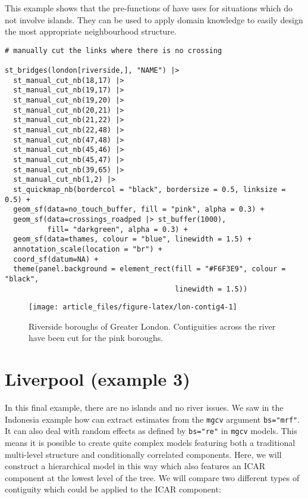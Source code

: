 This example shows that the pre-functions of  have uses for situations which do not involve islands. They can be used to apply domain knowledge to easily design the most appropriate neighbourhood structure.

\begin{verbatim}
# manually cut the links where there is no crossing

st_bridges(london[riverside,], "NAME") |> 
  st_manual_cut_nb(18,17) |> 
  st_manual_cut_nb(19,17) |> 
  st_manual_cut_nb(19,20) |> 
  st_manual_cut_nb(20,21) |> 
  st_manual_cut_nb(21,22) |> 
  st_manual_cut_nb(22,48) |> 
  st_manual_cut_nb(47,48) |> 
  st_manual_cut_nb(45,46) |> 
  st_manual_cut_nb(45,47) |>  
  st_manual_cut_nb(39,65) |> 
  st_manual_cut_nb(1,2) |> 
  st_quickmap_nb(bordercol = "black", bordersize = 0.5, linksize = 0.5) +
  geom_sf(data=no_touch_buffer, fill = "pink", alpha = 0.3) + 
  geom_sf(data=crossings_roadped |> st_buffer(1000), 
          fill= "darkgreen", alpha = 0.3) +
  geom_sf(data=thames, colour = "blue", linewidth = 1.5) +
  annotation_scale(location = "br") +
  coord_sf(datum=NA) + 
  theme(panel.background = element_rect(fill = "#F6F3E9", colour = "black", 
                                        linewidth = 1.5))
\end{verbatim}

\begin{figure}

{\centering \texttt{[image: article\_files/figure-latex/lon-contig4-1]} 

}

\caption{Riverside boroughs of Greater London. Contiguities across the river have been cut for the pink boroughs. }\label{fig:lon-contig4}
\end{figure}

\hypertarget{liverpool-example-3}{%
\section{Liverpool (example 3)}\label{liverpool-example-3}}

In this final example, there are no islands and no river issues. We saw in the Indonesia example how  can extract estimates from the \texttt{mgcv} argument \texttt{bs="mrf"}. It can also deal with random effects as defined by \texttt{bs="re"} in \texttt{mgcv} models. This means it is possible to create quite complex models featuring both a traditional multi-level structure and conditionally correlated components. Here, we will construct a hierarchical model in this way which also features an ICAR component at the lowest level of the tree. We will compare two different types of contiguity which could be applied to the ICAR component:

